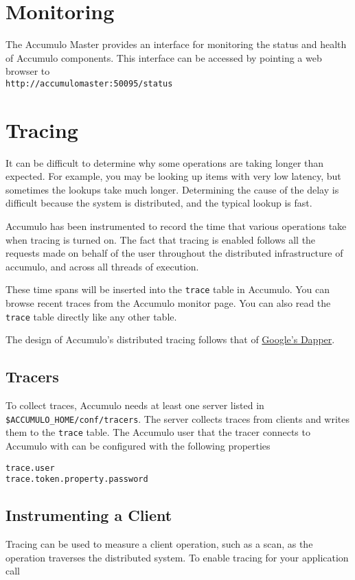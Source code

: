 \section{Monitoring}

The Accumulo Master provides an interface for monitoring the status and health of
Accumulo components. This interface can be accessed by pointing a web browser to\\
\texttt{http://accumulomaster:50095/status}

\section{Tracing}
It can be difficult to determine why some operations are taking longer
than expected. For example, you may be looking up items with very low
latency, but sometimes the lookups take much longer. Determining the
cause of the delay is difficult because the system is distributed, and
the typical lookup is fast.

Accumulo has been instrumented to record the time that various
operations take when tracing is turned on. The fact that tracing is
enabled follows all the requests made on behalf of the user throughout
the distributed infrastructure of accumulo, and across all threads of
execution.

These time spans will be inserted into the \texttt{trace} table in
Accumulo. You can browse recent traces from the Accumulo monitor
page. You can also read the \texttt{trace} table directly like any
other table.

The design of Accumulo's distributed tracing follows that of
\href{http://research.google.com/pubs/pub36356.html}{Google's Dapper}.

\subsection{Tracers}
To collect traces, Accumulo needs at least one server listed in
\\\texttt{\$ACCUMULO\_HOME/conf/tracers}. The server collects traces
from clients and writes them to the \texttt{trace} table. The Accumulo
user that the tracer connects to Accumulo with can be configured with
the following properties

\begingroup\fontsize{8pt}{8pt}\selectfont\begin{verbatim}
trace.user
trace.token.property.password
\end{verbatim}\endgroup

\subsection{Instrumenting a Client}
Tracing can be used to measure a client operation, such as a scan, as
the operation traverses the distributed system. To enable tracing for
your application call

